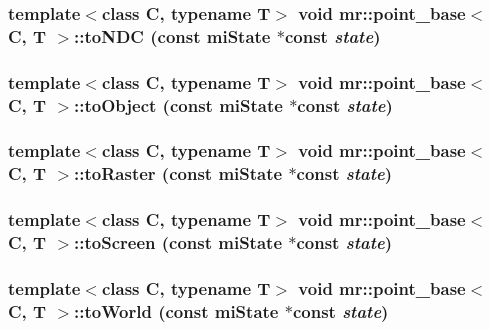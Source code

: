 \subsubsection{\setlength{\rightskip}{0pt plus 5cm}template$<$class C, typename T$>$ void {\bf mr::point\_\-base}$<$ C, T $>$::to\-NDC (const mi\-State $\ast$const {\em state})\hspace{0.3cm}{\tt  [inline]}}\label{structmr_1_1point__base_z74_4}


\subsubsection{\setlength{\rightskip}{0pt plus 5cm}template$<$class C, typename T$>$ void {\bf mr::point\_\-base}$<$ C, T $>$::to\-Object (const mi\-State $\ast$const {\em state})\hspace{0.3cm}{\tt  [inline]}}\label{structmr_1_1point__base_z74_0}


\subsubsection{\setlength{\rightskip}{0pt plus 5cm}template$<$class C, typename T$>$ void {\bf mr::point\_\-base}$<$ C, T $>$::to\-Raster (const mi\-State $\ast$const {\em state})\hspace{0.3cm}{\tt  [inline]}}\label{structmr_1_1point__base_z74_5}


\subsubsection{\setlength{\rightskip}{0pt plus 5cm}template$<$class C, typename T$>$ void {\bf mr::point\_\-base}$<$ C, T $>$::to\-Screen (const mi\-State $\ast$const {\em state})\hspace{0.3cm}{\tt  [inline]}}\label{structmr_1_1point__base_z74_3}


\subsubsection{\setlength{\rightskip}{0pt plus 5cm}template$<$class C, typename T$>$ void {\bf mr::point\_\-base}$<$ C, T $>$::to\-World (const mi\-State $\ast$const {\em state})\hspace{0.3cm}{\tt  [inline]}}\label{structmr_1_1point__base_z74_1}


